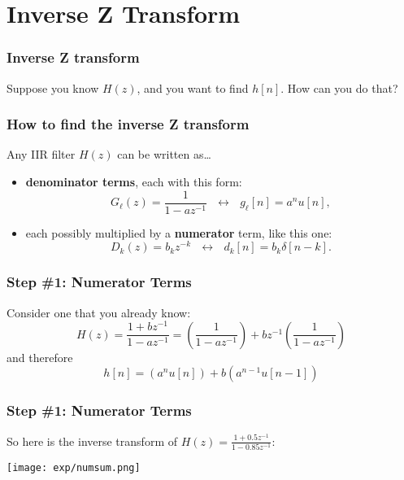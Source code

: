 \documentclass{beamer}
\begin{document}
\section[Inverse Z]{Inverse Z Transform}
\setcounter{subsection}{1}

\begin{frame}
  \frametitle{Inverse Z transform}

  Suppose you know $H(z)$, and you want to find $h[n]$.  How can you
  do that?
\end{frame}
      
\begin{frame}
  \frametitle{How to find the inverse Z transform}

  Any IIR filter $H(z)$ can be written as\ldots
  \begin{itemize}
  \item {\bf denominator terms}, each with this form:
    \begin{displaymath}
      G_\ell(z)=\frac{1}{1-az^{-1}}~~~\leftrightarrow~~~g_\ell[n]= a^nu[n],
    \end{displaymath}
  \item each possibly multiplied by a {\bf numerator} term, like this one:
    \begin{displaymath}
      D_k(z)=b_kz^{-k}~~~\leftrightarrow~~~d_k[n]=b_k\delta[n-k].
    \end{displaymath}
  \end{itemize}
\end{frame}

\begin{frame}
  \frametitle{Step \#1: Numerator Terms}

  Consider one that you already know:
  \begin{displaymath}
    H(z)=\frac{1+bz^{-1}}{1-az^{-1}}
    =\left(\frac{1}{1-az^{-1}}\right)+bz^{-1}\left(\frac{1}{1-az^{-1}}\right)
  \end{displaymath}
  and therefore
  \begin{displaymath}
    h[n] = \left(a^nu[n]\right) + b\left(a^{n-1}u[n-1]\right)
  \end{displaymath}
\end{frame}

\begin{frame}
  \frametitle{Step \#1: Numerator Terms}

  So here is the inverse transform of $H(z)=\frac{1+0.5z^{-1}}{1-0.85z^{-1}}$:
  \centerline{\texttt{[image: exp/numsum.png]}}
\end{frame}
\end{document}
